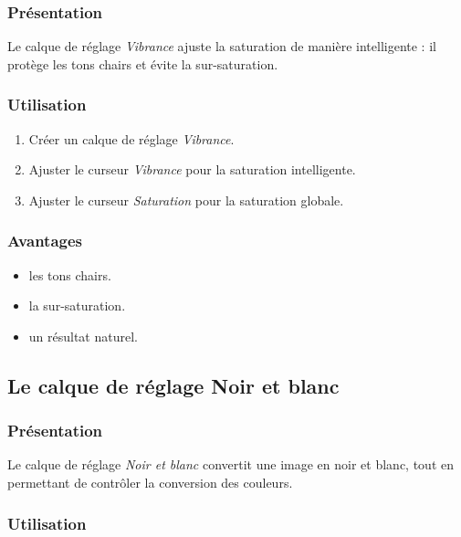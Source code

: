 \subsubsection{Présentation}

Le calque de réglage \emph{Vibrance} ajuste la saturation de manière intelligente : il protège les tons chairs et évite la sur-saturation.

\subsubsection{Utilisation}

\begin{enumerate}
    \item Créer un calque de réglage \emph{Vibrance}.
    \item Ajuster le curseur \emph{Vibrance} pour la saturation intelligente.
    \item Ajuster le curseur \emph{Saturation} pour la saturation globale.
\end{enumerate}

\subsubsection{Avantages}

\begin{itemize}
    \item {} les tons chairs.
    \item {} la sur-saturation.
    \item {} un résultat naturel.
\end{itemize}

\subsection{Le calque de réglage Noir et blanc}

\subsubsection{Présentation}

Le calque de réglage \emph{Noir et blanc} convertit une image en noir et blanc, tout en permettant de contrôler la conversion des couleurs.

\subsubsection{Utilisation}


